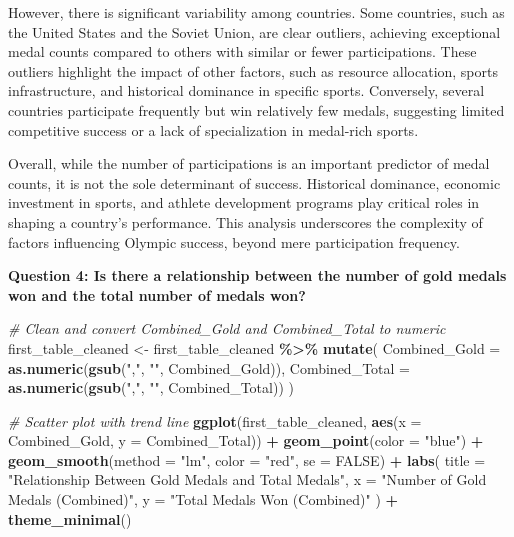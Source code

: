 \documentclass[
]{article}
\newenvironment{Shaded}{\begin{snugshade}}{\end{snugshade}}
\newcommand{\AttributeTok}[1]{\textcolor[rgb]{0.13,0.29,0.53}{#1}}
\newcommand{\CommentTok}[1]{\textcolor[rgb]{0.56,0.35,0.01}{\textit{#1}}}
\newcommand{\ConstantTok}[1]{\textcolor[rgb]{0.56,0.35,0.01}{#1}}
\newcommand{\FunctionTok}[1]{\textcolor[rgb]{0.13,0.29,0.53}{\textbf{#1}}}
\newcommand{\NormalTok}[1]{#1}
\newcommand{\OtherTok}[1]{\textcolor[rgb]{0.56,0.35,0.01}{#1}}
\newcommand{\SpecialCharTok}[1]{\textcolor[rgb]{0.81,0.36,0.00}{\textbf{#1}}}
\newcommand{\StringTok}[1]{\textcolor[rgb]{0.31,0.60,0.02}{#1}}
\begin{document}
However, there is significant variability among countries. Some
countries, such as the United States and the Soviet Union, are clear
outliers, achieving exceptional medal counts compared to others with
similar or fewer participations. These outliers highlight the impact of
other factors, such as resource allocation, sports infrastructure, and
historical dominance in specific sports. Conversely, several countries
participate frequently but win relatively few medals, suggesting limited
competitive success or a lack of specialization in medal-rich sports.

Overall, while the number of participations is an important predictor of
medal counts, it is not the sole determinant of success. Historical
dominance, economic investment in sports, and athlete development
programs play critical roles in shaping a country's performance. This
analysis underscores the complexity of factors influencing Olympic
success, beyond mere participation frequency.

\textbf{Question 4: Is there a relationship between the number of gold
medals won and the total number of medals won?}

\begin{Shaded}
\begin{Highlighting}[]
\CommentTok{\# Clean and convert Combined\_Gold and Combined\_Total to numeric}
\NormalTok{first\_table\_cleaned }\OtherTok{\textless{}{-}}\NormalTok{ first\_table\_cleaned }\SpecialCharTok{\%\textgreater{}\%}
  \FunctionTok{mutate}\NormalTok{(}
    \AttributeTok{Combined\_Gold =} \FunctionTok{as.numeric}\NormalTok{(}\FunctionTok{gsub}\NormalTok{(}\StringTok{","}\NormalTok{, }\StringTok{""}\NormalTok{, Combined\_Gold)), }
    \AttributeTok{Combined\_Total =} \FunctionTok{as.numeric}\NormalTok{(}\FunctionTok{gsub}\NormalTok{(}\StringTok{","}\NormalTok{, }\StringTok{""}\NormalTok{, Combined\_Total))}
\NormalTok{  )}

\CommentTok{\# Scatter plot with trend line}
\FunctionTok{ggplot}\NormalTok{(first\_table\_cleaned, }\FunctionTok{aes}\NormalTok{(}\AttributeTok{x =}\NormalTok{ Combined\_Gold, }\AttributeTok{y =}\NormalTok{ Combined\_Total)) }\SpecialCharTok{+}
  \FunctionTok{geom\_point}\NormalTok{(}\AttributeTok{color =} \StringTok{"blue"}\NormalTok{) }\SpecialCharTok{+} 
  \FunctionTok{geom\_smooth}\NormalTok{(}\AttributeTok{method =} \StringTok{"lm"}\NormalTok{, }\AttributeTok{color =} \StringTok{"red"}\NormalTok{, }\AttributeTok{se =} \ConstantTok{FALSE}\NormalTok{) }\SpecialCharTok{+} 
  \FunctionTok{labs}\NormalTok{(}
    \AttributeTok{title =} \StringTok{"Relationship Between Gold Medals and Total Medals"}\NormalTok{,}
    \AttributeTok{x =} \StringTok{"Number of Gold Medals (Combined)"}\NormalTok{,}
    \AttributeTok{y =} \StringTok{"Total Medals Won (Combined)"}
\NormalTok{  ) }\SpecialCharTok{+}
  \FunctionTok{theme\_minimal}\NormalTok{()}
\end{Highlighting}
\end{Shaded}
\end{document}
